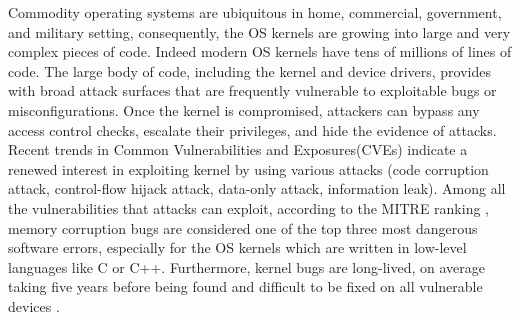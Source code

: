 \documentclass[conference]{IEEEtran}
\begin{document}

Commodity operating systems are ubiquitous in home, commercial, government, and military setting, consequently, the OS kernels are growing into large and very complex pieces of code. Indeed modern OS kernels have tens of millions of lines of code. 
The large body of code, including the kernel and device drivers, provides with broad attack surfaces that are frequently vulnerable to exploitable bugs or misconfigurations. Once the kernel is compromised, attackers can bypass any access control checks, escalate their privileges, and hide the evidence of attacks. 
Recent trends in Common Vulnerabilities and Exposures(CVEs) indicate a renewed interest in exploiting kernel \cite{cve} by using various attacks (code corruption attack, control-flow hijack attack, %
data-only attack, %
information leak). %
Among all the vulnerabilities that attacks can exploit, according to the MITRE ranking \cite{top25}, memory corruption bugs are considered one of the top three most dangerous software errors, especially for the OS kernels which are written in low-level languages like C or C++. Furthermore, kernel bugs are long-lived, on average taking five years before being found and difficult to be fixed on all vulnerable devices \cite{bugfix}. 
\end{document}
